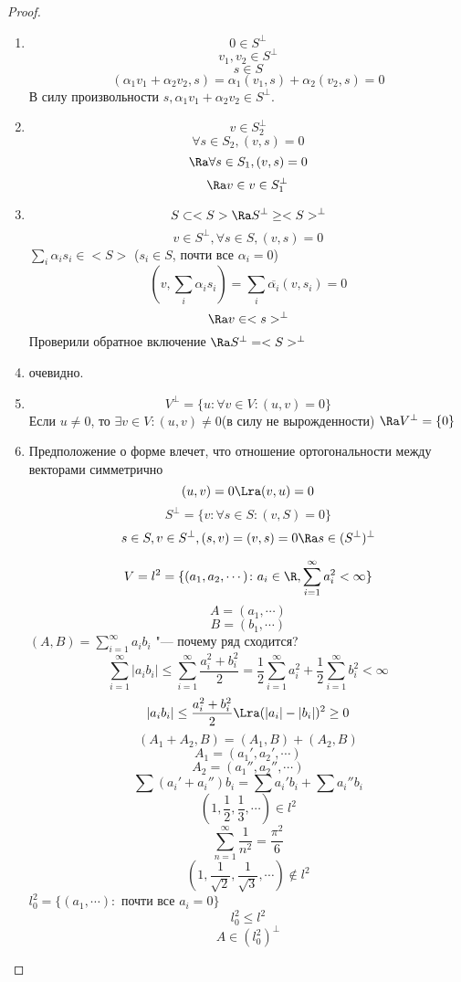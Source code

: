 \begin{proof}
    \begin{enumerate}
    \item $$0 \in S^{\bot}$$
    $$v_1, v_2 \in S^{\bot}$$
    $$s \in S$$
    $$(\alpha_1 v_1 + \alpha_2 v_2, s) = \alpha_1(v_1, s) + \alpha_2(v_2, s) = 0$$
    В силу произвольности $s, \alpha_1 v_1 + \alpha_2 v_2 \in S^{\bot}$.

    \item $$v \in S_2^{\bot}$$ 
    $$\forall s \in S_2, (v, s) = 0$$
    $$\Ra \forall s \in S_1, (v, s) = 0$$
    $$\Ra v \in v \in S_1^{\bot}$$
    \item 
    $$S \subset <S> \Ra S^{\bot} \ge <S>^{\bot} $$
    $$v \in S^{\bot}, \forall s \in S, (v, s) = 0$$
    $\sum_i \alpha_i s_i \in <S>$ ($s_i \in S$, почти все $\alpha_i = 0$)
    $$(v, \sum_i \alpha_i s_i) = \sum_i \overline{\alpha_i}(v, s_i) = 0$$
    $$\Ra v \in <s>^{\bot}$$
    Проверили обратное включение $\Ra S^{\bot} = <S>^{\bot}$
    \item очевидно.
    \item $$V^{\bot} = \{u \colon \forall v \in V \colon (u, v) = 0\}$$ 
    Если $u \ne 0$, то $\exists v \in V \colon (u, v) \ne 0$(в силу не вырожденности)
    $\Ra V^{\bot} = \{0\}$
    \item Предположение о форме влечет, что отношение ортогональности между векторами симметрично
    $$(u, v) = 0 \Lra (v, u) = 0$$
    $$S^{\bot} = \{v\colon \forall s \in S \colon (v, S) = 0\}$$
    $$s \in S, v \in S^{\bot}, (s, v) = (v, s) = 0 \Ra s \in (S^{\bot})^{\bot}$$
    \begin{exmp}
    $$V = l^2 = \{(a_1, a_2, \cdots)\colon a_i \in \R, \sum_{i = 1}^{\infty} a_i^2 < \infty\}$$
    $$A = (a_1, \cdots)$$
    $$B = (b_1, \cdots)$$
    $(A, B) = \sum_{i = 1}^{\infty}a_i b_i$ "--- почему ряд сходится?
    $$\sum_{i = 1}^{\infty} |a_i b_i|\le \sum_{i = 1}^{\infty} \frac{a_i^2 + b_i^2}{2} = \frac{1}{2}\sum_{i = 1}^{\infty}a_i^2 + \frac{1}{2}\sum_{i = 1}^{\infty}b_i^2  < \infty$$
    $$|a_i b_i| \le \frac{a_i^2 + b_i^2}{2} \Lra (|a_i| - |b_i|)^2 \ge 0$$
    $$(A_1 + A_2, B) = (A_1, B) + (A_2, B)$$
    $$A_1 = (a_1', a_2', \cdots)$$
    $$A_2 = (a_1'', a_2'', \cdots)$$
    $$\sum(a_i' + a_i'')b_i = \sum a_i'b_i + \sum a_i''b_i$$
    $$(1, \frac{1}{2}, \frac{1}{3}, \cdots) \in l^2$$
    $$\sum_{n = 1}^{\infty}\frac{1}{n^2} = \frac{\pi^2}{6}$$
    $$(1, \frac{1}{\sqrt{2}}, \frac{1}{\sqrt{3}}, \cdots) \notin l^2$$
    $l^2_0 = \{(a_1, \cdots):$ почти все $a_i = 0\}$
    $$l_0^2 \le l^2$$
    $$A \in (l_0^2)^{\bot}$$

\end{exmp}
\end{enumerate}
\end{proof}
